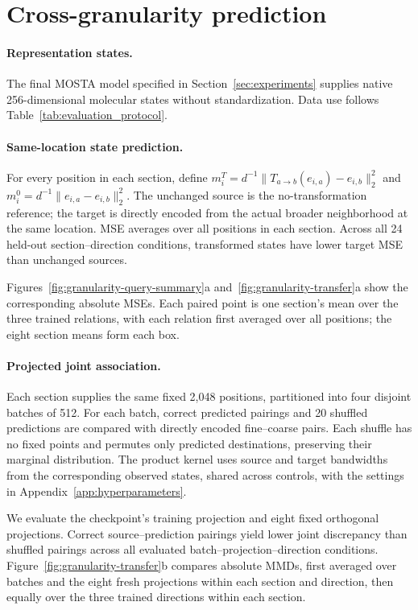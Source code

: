 \section{Cross-granularity prediction}
\label{app:granularity-transfer}

\paragraph{Representation states.}
The final MOSTA model specified in Section~\ref{sec:experiments} supplies native 256-dimensional molecular states without standardization. Data use follows Table~\ref{tab:evaluation_protocol}.

\paragraph{Same-location state prediction.}
For every position in each section, define $m_i^T=d^{-1}\|T_{a\to b}(e_{i,a})-e_{i,b}\|_2^2$ and $m_i^0=d^{-1}\|e_{i,a}-e_{i,b}\|_2^2$. The unchanged source is the no-transformation reference; the target is directly encoded from the actual broader neighborhood at the same location. MSE averages over all positions in each section. Across all 24 held-out section--direction conditions, transformed states have lower target MSE than unchanged sources.

Figures~\ref{fig:granularity-query-summary}a and~\ref{fig:granularity-transfer}a show the corresponding absolute MSEs. Each paired point is one section's mean over the three trained relations, with each relation first averaged over all positions; the eight section means form each box.

\paragraph{Projected joint association.}
Each section supplies the same fixed 2,048 positions, partitioned into four disjoint batches of 512. For each batch, correct predicted pairings and 20 shuffled predictions are compared with directly encoded fine--coarse pairs. Each shuffle has no fixed points and permutes only predicted destinations, preserving their marginal distribution. The product kernel uses source and target bandwidths from the corresponding observed states, shared across controls, with the settings in Appendix~\ref{app:hyperparameters}.

We evaluate the checkpoint's training projection and eight fixed orthogonal projections. Correct source--prediction pairings yield lower joint discrepancy than shuffled pairings across all evaluated batch--projection--direction conditions. Figure~\ref{fig:granularity-transfer}b compares absolute MMDs, first averaged over batches and the eight fresh projections within each section and direction, then equally over the three trained directions within each section.

